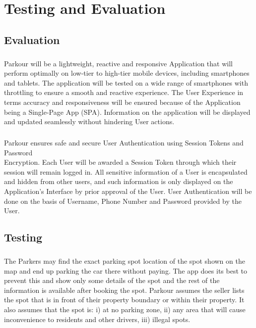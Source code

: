 \chapter{Testing and Evaluation}

    \section{Evaluation}
    \paragraph*{}
    Parkour will be a lightweight, reactive and responsive Application that will perform optimally on low-tier to high-tier mobile devices, including smartphones and tablets. The application will be tested on a wide range of smartphones with throttling to ensure a smooth and reactive experience. The User Experience in terms accuracy and responsiveness will be ensured because of the Application being a Single-Page App (SPA). Information on the application will be displayed and updated seamlessly without hindering User actions.


    \paragraph*{}
    Parkour ensures safe and secure User Authentication using Session Tokens and Password\\ Encryption. Each User will be awarded a Session Token through which their session will remain logged in. All sensitive information of a User is encapsulated and hidden from other users, and such information is only displayed on the Application’s Interface by prior approval of the User. User Authentication will be done on the basis of Username, Phone Number and Password provided by the User.

    \section{Testing}
    \paragraph*{}
    The Parkers may find the exact parking spot location of the spot shown on the map and end up parking the car there without paying. The app does its best to prevent this and show only some details of the spot and the rest of the information is available after booking the spot. 
    Parkour assumes the seller lists the spot that is in front of their property boundary or within their property. It also assumes that the spot is: i) at no parking zone, ii)  any area that will cause inconvenience to residents and other drivers, iii) illegal spots. 


